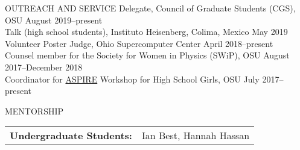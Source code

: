 \documentclass{resume} %
\begin{document}
\begin{rSection}{OUTREACH AND SERVICE}
Delegate, Council of Graduate Students (CGS), OSU \hfill August 2019--present\\
Talk (high school students), Instituto Heisenberg, Colima, Mexico  \hfill May 2019\\
Volunteer Poster Judge, Ohio Supercomputer Center  \hfill April 2018--present\\
Counsel member for the Society for Women in Physics (SWiP), OSU \hfill August 2017--December 2018\\
Coordinator for \href{u.osu.edu/aspire}{ASPIRE} Workshop for High School Girls, OSU \hfill July 2017--present\\
\end{rSection}
\vspace{-0.30cm}

\begin{rSection}{MENTORSHIP}
\begin{table}[h]
\begin{tabularx}{\textwidth}{l X}
{\bf Undergraduate Students:}  & Ian Best, Hannah Hassan \\
\end{tabularx}
\end{table}
\end{rSection}
\end{document}
